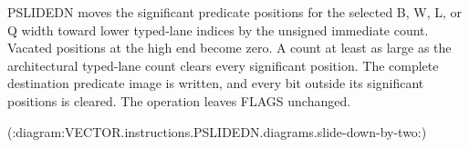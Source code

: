 PSLIDEDN moves the significant predicate positions for the selected B, W, L, or Q width toward lower typed-lane indices by the unsigned immediate count.
Vacated positions at the high end become zero.
A count at least as large as the architectural typed-lane count clears every significant position.
The complete destination predicate image is written, and every bit outside its significant positions is cleared.
The operation leaves FLAGS unchanged.

(:diagram:VECTOR.instructions.PSLIDEDN.diagrams.slide-down-by-two:)
